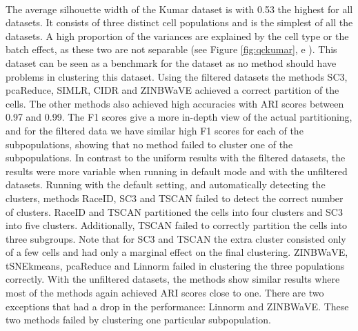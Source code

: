 \documentclass[12pt, a4paper]{article}\usepackage[]{graphicx}\usepackage[]{color}
\begin{document}
\paragraph{}
The average silhouette width of the Kumar dataset is with 0.53 the highest for all datasets. It consists of three distinct cell populations and is the simplest of all the datasets. A high proportion of the variances are explained by the cell type or the batch effect, as these two are not separable (see Figure \ref{fig:qckumar}, e ). This dataset can be seen as a benchmark for the dataset as no method should have problems in clustering this dataset. Using the filtered datasets the methods SC3, pcaReduce, SIMLR, CIDR and ZINBWaVE achieved a correct partition of the cells. The other methods also achieved high accuracies with ARI scores between 0.97 and 0.99. The F1 scores give a more in-depth view of the actual partitioning, and for the filtered data we have similar high F1 scores for each of the subpopulations, showing that no method failed to cluster one of the subpopulations. In contrast to the uniform results with the filtered datasets, the results were more variable when running in default mode and with the unfiltered datasets. Running with the default setting, and automatically detecting the clusters, methods RaceID, SC3 and TSCAN failed to detect the correct number of clusters. RaceID and TSCAN partitioned the cells into four clusters and SC3 into five clusters. Additionally, TSCAN failed to correctly partition the cells into three subgroups. Note that for SC3 and TSCAN the extra cluster consisted only of a few cells and had only a marginal effect on the final clustering. ZINBWaVE, tSNEkmeans, pcaReduce and Linnorm failed in clustering the three populations correctly.
With the unfiltered datasets, the methods show similar results where most of the methods again achieved ARI scores close to one. There are two exceptions that had a drop in the performance: Linnorm and ZINBWaVE. These two methods failed by clustering one particular subpopulation.
\end{document}
